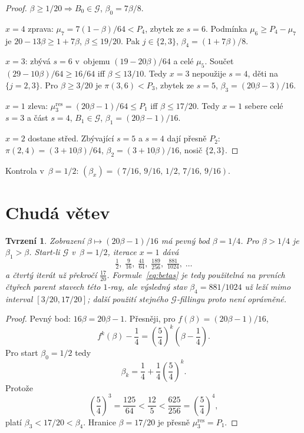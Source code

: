 \documentclass[11pt,a4paper]{article}
\newtheorem{proposition}[theorem]{Tvrzení}
\theoremstyle{definition}
\theoremstyle{remark}
\newcommand{\cG}{\mathcal G}
\begin{document}
\begin{proof}
\(\beta\ge 1/20\Rightarrow B_0\in\cG\), \(\beta_0=7\beta/8\).

\(x=4\) zprava: \(\mu_7=7(1-\beta)/64<P_4\), zbytek ze \(s=6\).
Podmínka \(\mu_6\ge P_4-\mu_7\) je \(20-13\beta\ge 1+7\beta\), \(\beta\le 19/20\).
Pak \(j\in\{2,3\}\), \(\beta_4=(1+7\beta)/8\).

\(x=3\): zbývá \(s=6\) v~objemu \((19-20\beta)/64\) a celé \(\mu_5\).
Součet \((29-10\beta)/64\ge 16/64\) iff \(\beta\le 13/10\). Tedy \(x=3\) nepoužije \(s=4\),
děti na \(\{j=2,3\}\). Pro \(\beta\ge 3/20\) je \(\pi(3,6)<P_3\), zbytek ze \(s=5\),
\(\beta_3=(20\beta-3)/16\).

\(x=1\) zleva: \(\mu^{\mathrm{res}}_3=(20\beta-1)/64\le P_1\) iff \(\beta\le 17/20\).
Tedy \(x=1\) sebere celé \(s=3\) a část \(s=4\), \(B_1\in\cG\), \(\beta_1=(20\beta-1)/16\).

\(x=2\) dostane střed. Zbývající \(s=5\) a \(s=4\) dají přesně \(P_2\):
\(\pi(2,4)=(3+10\beta)/64\), \(\beta_2=(3+10\beta)/16\), nosič \(\{2,3\}\).
\end{proof}

Kontrola v~\(\beta=1/2\): \((\beta_x)=(7/16,\,9/16,\,1/2,\,7/16,\,9/16)\).

\section{Chudá větev}
\label{sec:poor}

\begin{proposition}
\label{prop:poor}
Zobrazení \(\beta\mapsto(20\beta-1)/16\) má pevný bod \(\beta=1/4\).
Pro \(\beta>1/4\) je \(\beta_1>\beta\). Start-li \(\cG\) v~\(\beta=1/2\), iterace \(x=1\) dává
\[
\tfrac12,\; \tfrac9{16},\; \tfrac{41}{64},\; \tfrac{189}{256},\;
\tfrac{881}{1024},\;\dots
\]
a čtvrtý iterát už překročí \(\tfrac{17}{20}\).  Formule~\eqref{eq:betas}
je tedy použitelná na prvních čtyřech parent stavech této \(1\)-ray, ale
výsledný stav \(\beta_4=881/1024\) už leží mimo interval
\([3/20,17/20]\); další použití stejného \(\cG\)-fillingu proto není
oprávněné.
\end{proposition}

\begin{proof}
Pevný bod: \(16\beta=20\beta-1\). Přesněji, pro
\(f(\beta)=(20\beta-1)/16\),
\[
\boxed{
f^k(\beta)-\frac14=
\left(\frac54\right)^k\left(\beta-\frac14\right).
}
\]
Pro start \(\beta_0=1/2\) tedy
\[
\beta_k=\frac14+\frac14\left(\frac54\right)^k.
\]
Protože
\[
\left(\frac54\right)^3=\frac{125}{64}<\frac{12}{5}
<\frac{625}{256}=\left(\frac54\right)^4,
\]
platí \(\beta_3<17/20<\beta_4\). Hranice \(\beta=17/20\) je přesně
\(\mu^{\mathrm{res}}_3=P_1\).
\end{proof}
\end{document}
